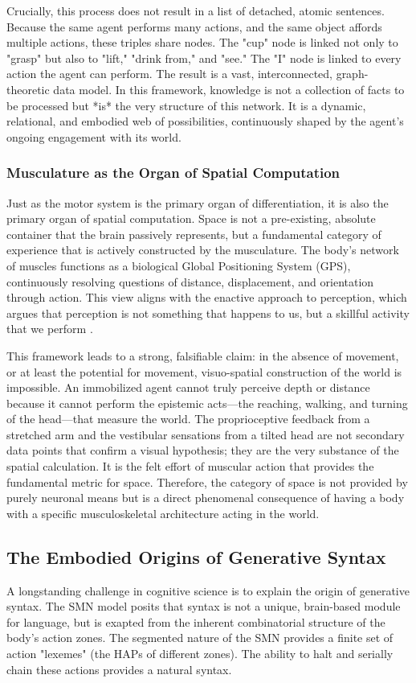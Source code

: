 Crucially, this process does not result in a list of detached, atomic sentences. Because the same agent performs many actions, and the same object affords multiple actions, these triples share nodes. The "cup" node is linked not only to "grasp" but also to "lift," "drink from," and "see." The "I" node is linked to every action the agent can perform. The result is a vast, interconnected, graph-theoretic data model. In this framework, knowledge is not a collection of facts to be processed but *is* the very structure of this network. It is a dynamic, relational, and embodied web of possibilities, continuously shaped by the agent's ongoing engagement with its world.

\subsubsection{Musculature as the Organ of Spatial Computation}
\label{ssubsec:muscles_space}
Just as the motor system is the primary organ of differentiation, it is also the primary organ of spatial computation. Space is not a pre-existing, absolute container that the brain passively represents, but a fundamental category of experience that is actively constructed by the musculature. The body's network of muscles functions as a biological Global Positioning System (GPS), continuously resolving questions of distance, displacement, and orientation through action. This view aligns with the enactive approach to perception, which argues that perception is not something that happens to us, but a skillful activity that we perform \cite{noe_action_2004}.

This framework leads to a strong, falsifiable claim: in the absence of movement, or at least the potential for movement, visuo-spatial construction of the world is impossible. An immobilized agent cannot truly perceive depth or distance because it cannot perform the epistemic acts—the reaching, walking, and turning of the head—that measure the world. The proprioceptive feedback from a stretched arm and the vestibular sensations from a tilted head are not secondary data points that confirm a visual hypothesis; they are the very substance of the spatial calculation. It is the felt effort of muscular action that provides the fundamental metric for space. Therefore, the category of space is not provided by purely neuronal means but is a direct phenomenal consequence of having a body with a specific musculoskeletal architecture acting in the world.

\subsection{The Embodied Origins of Generative Syntax}
\label{subsec:syntax}
A longstanding challenge in cognitive science is to explain the origin of generative syntax. The SMN model posits that syntax is not a unique, brain-based module for language, but is exapted from the inherent combinatorial structure of the body's action zones. The segmented nature of the SMN provides a finite set of action "lexemes" (the HAPs of different zones). The ability to halt and serially chain these actions provides a natural syntax. 

